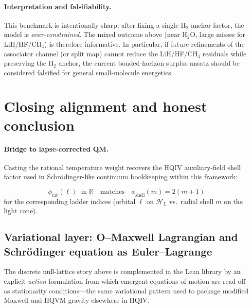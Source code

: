 \documentclass[11pt,a4paper]{article}
\theoremstyle{remark}
\begin{document}
\paragraph{Interpretation and falsifiability.}
This benchmark is intentionally sharp: after fixing a single H$_2$ anchor factor, the model
is \emph{over-constrained}. The mixed outcome above (near H$_2$O, large misses for LiH/HF/CH$_4$)
is therefore informative. In particular, if future refinements of the associator channel
(or split map) cannot reduce the LiH/HF/CH$_4$ residuals while preserving the H$_2$ anchor,
the current bonded-horizon surplus ansatz should be considered falsified for general
small-molecule energetics.

\section{Closing alignment and honest conclusion}
\label{sec:closing}

\paragraph{Bridge to lapse-corrected QM.}
Casting the rational temperature weight recovers the HQIV auxiliary-field shell factor used in Schr\"odinger-like continuum bookkeeping within this framework:

\begin{equation}
  \phi_{\mathrm{rat}}(\ell) \;\text{ in }\mathbb{R}
  \quad\text{matches}\quad
  \phi_{\mathrm{shell}}(m)=2(m+1)
\end{equation}
for the corresponding ladder indices (orbital $\ell$ on $\mathcal{H}_L$ vs.\ radial shell $m$ on the light cone).

\subsection{Variational layer: O--Maxwell Lagrangian and Schr\"odinger equation as Euler--Lagrange}
\label{sec:lagrangian}
The discrete null-lattice story above is complemented in the Lean library by an explicit \emph{action} formulation from which emergent equations of motion are read off as stationarity conditions---the same variational pattern used to package modified Maxwell and HQVM gravity elsewhere in HQIV.
\end{document}
